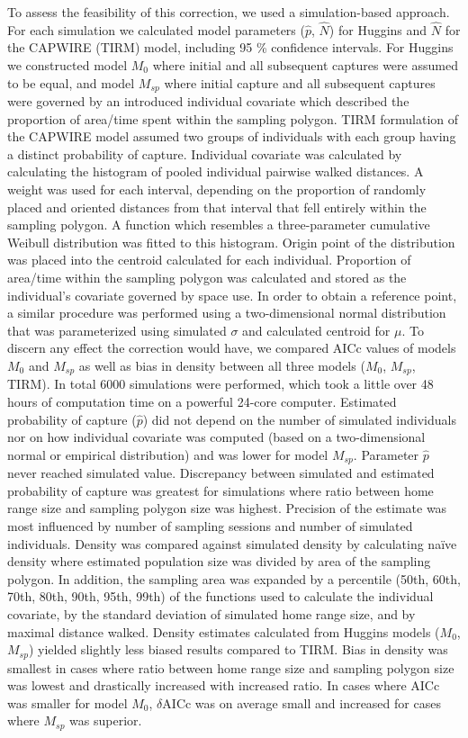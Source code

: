 To assess the feasibility of this correction, we used a simulation-based approach. For each simulation we calculated model parameters ($\hat{p}$, $\hat{N}$) for Huggins and $\hat{N}$ for the CAPWIRE (TIRM) model, including 95 \% confidence intervals. For Huggins we constructed model $M_0$ where initial and all subsequent captures were assumed to be equal, and model $M_{sp}$ where initial capture and all subsequent captures were governed by an introduced individual covariate which described the proportion of area/time spent within the sampling polygon. TIRM formulation of the CAPWIRE model assumed two groups of individuals with each group having a distinct probability of capture. Individual covariate was calculated by calculating the histogram of pooled individual pairwise walked distances. A weight was used for each interval, depending on the proportion of randomly placed and oriented distances from that interval that fell entirely within the sampling polygon. A function which resembles a three-parameter cumulative Weibull distribution was fitted to this histogram. Origin point of the distribution was placed into the centroid calculated for each individual. Proportion of area/time within the sampling polygon was calculated and stored as the individual's covariate governed by space use. In order to obtain a reference point, a similar procedure was performed using a two-dimensional normal distribution that was parameterized using simulated $\sigma$ and calculated centroid for $\mu$. To discern any effect the correction would have, we compared AICc values of models $M_0$ and $M_{sp}$ as well as bias in density between all three models ($M_0$, $M_{sp}$, TIRM). In total 6000 simulations were performed, which took a little over 48 hours of computation time on a powerful 24-core computer. Estimated probability of capture ($\hat{p}$) did not depend on the number of simulated individuals nor on how individual covariate was computed (based on a two-dimensional normal or empirical distribution) and was lower for model $M_{sp}$. Parameter $\hat{p}$ never reached simulated value. Discrepancy between simulated and estimated probability of capture was greatest for simulations where ratio between home range size and sampling polygon size was highest. Precision of the estimate was most influenced by number of sampling sessions and number of simulated individuals. Density was compared against simulated density by calculating naïve density where estimated population size was divided by area of the sampling polygon. In addition, the sampling area was expanded by a percentile (50th, 60th, 70th, 80th, 90th, 95th, 99th) of the functions used to calculate the individual covariate, by the standard deviation of simulated home range size, and by maximal distance walked. Density estimates calculated from Huggins models ($M_0$, $M_{sp}$) yielded slightly less biased results compared to TIRM. Bias in density was smallest in cases where ratio between home range size and sampling polygon size was lowest and drastically increased with increased ratio. In cases where AICc was smaller for model $M_0$, $\delta$AICc was on average small and increased for cases where $M_{sp}$ was superior.

